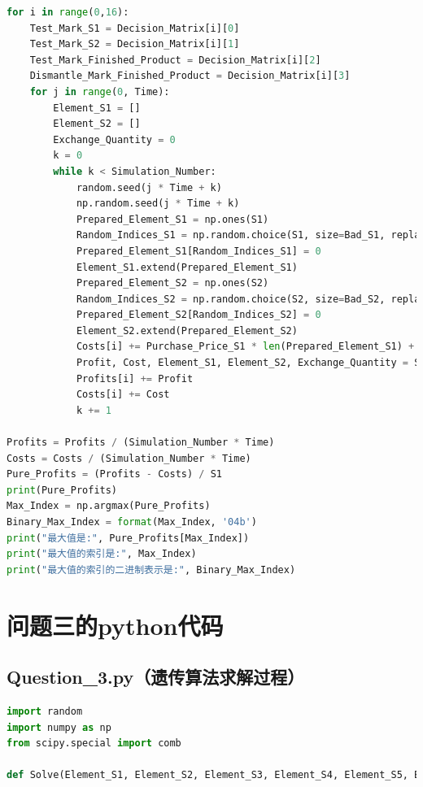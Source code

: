 \documentclass[withoutpreface,bwprint]{cumcmthesis} %
\begin{document}
\begin{appendices}
\begin{lstlisting}[language=python]
for i in range(0,16):
    Test_Mark_S1 = Decision_Matrix[i][0]
    Test_Mark_S2 = Decision_Matrix[i][1]
    Test_Mark_Finished_Product = Decision_Matrix[i][2]
    Dismantle_Mark_Finished_Product = Decision_Matrix[i][3]
    for j in range(0, Time):
        Element_S1 = []
        Element_S2 = []
        Exchange_Quantity = 0
        k = 0
        while k < Simulation_Number:
            random.seed(j * Time + k)
            np.random.seed(j * Time + k)
            Prepared_Element_S1 = np.ones(S1)
            Random_Indices_S1 = np.random.choice(S1, size=Bad_S1, replace=False)
            Prepared_Element_S1[Random_Indices_S1] = 0
            Element_S1.extend(Prepared_Element_S1)
            Prepared_Element_S2 = np.ones(S2)
            Random_Indices_S2 = np.random.choice(S2, size=Bad_S2, replace=False)
            Prepared_Element_S2[Random_Indices_S2] = 0
            Element_S2.extend(Prepared_Element_S2)
            Costs[i] += Purchase_Price_S1 * len(Prepared_Element_S1) + Purchase_Price_S2 * len(Prepared_Element_S2)
            Profit, Cost, Element_S1, Element_S2, Exchange_Quantity = Solve(Element_S1, Element_S2, Test_Mark_S1, Test_Mark_S2, Test_Mark_Finished_Product, Dismantle_Mark_Finished_Product, Exchange_Quantity)
            Profits[i] += Profit
            Costs[i] += Cost
            k += 1

Profits = Profits / (Simulation_Number * Time)
Costs = Costs / (Simulation_Number * Time)
Pure_Profits = (Profits - Costs) / S1
print(Pure_Profits)
Max_Index = np.argmax(Pure_Profits)
Binary_Max_Index = format(Max_Index, '04b')
print("最大值是:", Pure_Profits[Max_Index])
print("最大值的索引是:", Max_Index)
print("最大值的索引的二进制表示是:", Binary_Max_Index)

\end{lstlisting}
\section{问题三的python代码}
\subsection{Question\_3.py（遗传算法求解过程）}
\begin{lstlisting}[language=python]
	import random
import numpy as np
from scipy.special import comb

def Solve(Element_S1, Element_S2, Element_S3, Element_S4, Element_S5, Element_S6, Element_S7, Element_S8, Semi_Finished_Product_S1, Semi_Finished_Product_S2, Semi_Finished_Product_S3, Semi_Finished_Product_S1_Form, Semi_Finished_Product_S2_Form, Semi_Finished_Product_S3_Form, Decision_Vector, Exchange_Quantity):


\end{lstlisting}
\end{appendices}
\end{document}
